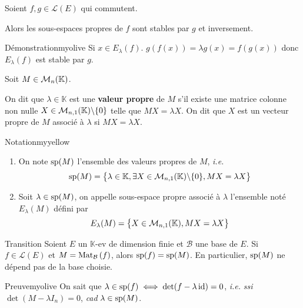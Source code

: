     \begin{prop}{}{}
        Soient $f,g \in \mathcal{L}(E)$ qui commutent.

        Alors les sous-espaces propres de $f$ sont stables par $g$ et inversement.
    \end{prop}

    \begin{demo}{Démonstration}{myolive}
        Si $x \in E_{\lambda}(f)$. $g(f(x)) = \lambda g(x) = f(g(x))$ donc $E_{\lambda}(f)$ est stable par $g$.
    \end{demo}

    \begin{defi}{}{}
        Soit $M \in \mk{n}$.

        On dit que $\lambda \in \mathbb{K}$ est une \textbf{valeur propre} de $M$ s’il existe une matrice colonne non nulle $X \in \mk{n,1} \backslash \{ 0 \}$ telle que $MX = \lambda X$. On dit que $X$ est un vecteur propre de $M$ associé à $\lambda$ si $MX = \lambda X$.
    \end{defi}

    \begin{omed}{Notation}{myyellow}
        \begin{enumerate}[label=\textcolor{myyellow}{\arabic*.}]
            \item On note $\sp(M)$ l’ensemble des valeurs propres de $M$, \textit{i.e.} 
            \[ \sp(M) = \big\{ \lambda \in \mathbb{K}, \exists X \in \mk{n,1} \backslash \{ 0 \}, MX = \lambda X \big\} \]
            \item Soit $\lambda \in \sp(M)$, on appelle sous-espace propre associé à $\lambda$ l’ensemble noté $E_{\lambda}(M)$ défini par 
            \[ E_{\lambda}(M) = \big\{ X \in \mk{n,1}, MX = \lambda X \big\} \]
        \end{enumerate}
    \end{omed}

    \begin{prop}{Transition}{}
        Soient $E$ un $\mathbb{K}$-ev de dimension finie et $\mathcal{B}$ une base de $E$. Si $f \in \mathcal{L}(E)$ et $M = \mat{\mathcal{B}}{f}$, alors $\sp(f) = \sp(M)$. En particulier, $\sp(M)$ ne dépend pas de la base choisie.
    \end{prop}

    \begin{demo}{Preuve}{myolive}
        On sait que $\lambda \in \sp(f) \iff \det(f - \lambda \id) = 0$, \textit{i.e.} \textit{ssi} $\det(M - \lambda I_n) = 0$, \textit{cad} $\lambda \in \sp(M)$.
    \end{demo}

